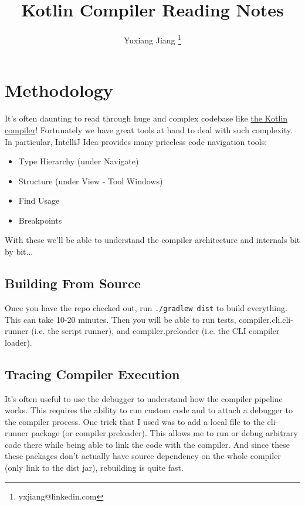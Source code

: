 \documentclass{article}
\begin{document}
\title{Kotlin Compiler Reading Notes}
\author{Yuxiang Jiang \thanks{yxjiang@linkedin.com}}
\maketitle

\newcommand{\textSafeTo}{\texorpdfstring{$\to$}{to} }

\tableofcontents

\section{Methodology}
It's often daunting to read through huge and complex codebase like \href{https://github.com/JetBrains/kotlin}{the Kotlin compiler}! Fortunately we have great tools at hand to deal with such complexity. In particular, IntelliJ Idea provides many priceless code navigation tools:
\begin{itemize}
    \item Type Hierarchy (under Navigate)
    \item Structure (under View - Tool Windows)
    \item Find Usage
    \item Breakpoints
\end{itemize}

With these we'll be able to understand the compiler architecture and internals bit by bit...

\begin{dot2tex}[dot,scale=0.3]

\end{dot2tex}

\subsection{Building From Source}
Once you have the repo checked out, run \texttt{./gradlew dist} to build everything. This can take 10-20 minutes. Then you will be able to run tests, compiler.cli.cli-runner (i.e. the script runner), and compiler.preloader (i.e. the CLI compiler loader).

\subsection{Tracing Compiler Execution}

It's often useful to use the debugger to understand how the compiler pipeline works. This requires the ability to run custom code and to attach a debugger to the compiler process. One trick that I used was to add a local file to the cli-runner package (or compiler.preloader). This allows me to run or debug arbitrary code there while being able to link the code with the compiler. And since these these packages don't actually have source dependency on the whole compiler (only link to the dist jar), rebuilding is quite fast.
\end{document}
